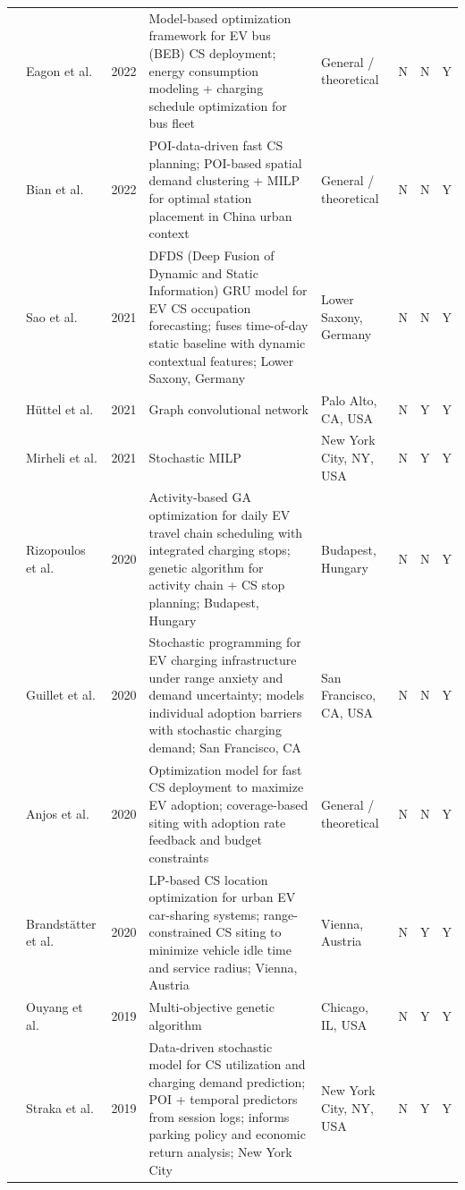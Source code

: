 \documentclass[letterpaper, 12pt, oneside, doublespacing]{Thesis}
\begin{document}
\begin{longtable}{L{0.9cm} L{1.8cm} L{0.7cm} L{2.5cm} L{2.1cm} L{0.7cm} L{0.7cm} L{0.7cm}}
\cite{model-based_framework_2022} & Eagon et al. & 2022 & Model-based optimization framework for EV bus (BEB) CS deployment; energy consumption modeling + charging schedule optimization for bus fleet & General {\slash} theoretical & N & N & Y \\
\cite{planning_of_2022} & Bian et al. & 2022 & POI-data-driven fast CS planning; POI-based spatial demand clustering + MILP for optimal station placement in China urban context & General {\slash} theoretical & N & N & Y \\
\cite{deep_information_2021} & Sao et al. & 2021 & DFDS (Deep Fusion of Dynamic and Static Information) GRU model for EV CS occupation forecasting; fuses time-of-day static baseline with dynamic contextual features; Lower Saxony, Germany & Lower Saxony, Germany & N & N & Y \\
\cite{deep_spatio-temporal_2021} & H\"uttel et al. & 2021 & Graph convolutional network & Palo Alto, CA, USA & N & Y & Y \\
\cite{hierarchical_optimization_2021} & Mirheli et al. & 2021 & Stochastic MILP & New York City, NY, USA & N & Y & Y \\
\cite{a_method_2020} & Rizopoulos et al. & 2020 & Activity-based GA optimization for daily EV travel chain scheduling with integrated charging stops; genetic algorithm for activity chain + CS stop planning; Budapest, Hungary & Budapest, Hungary & N & N & Y \\
\cite{electric_vehicle_2020} & Guillet et al. & 2020 & Stochastic programming for EV charging infrastructure under range anxiety and demand uncertainty; models individual adoption barriers with stochastic charging demand; San Francisco, CA & San Francisco, CA, USA & N & N & Y \\
\cite{increasing_electric_2020} & Anjos et al. & 2020 & Optimization model for fast CS deployment to maximize EV adoption; coverage-based siting with adoption rate feedback and budget constraints & General {\slash} theoretical & N & N & Y \\
\cite{location_of_2020} & Brandst\"atter et al. & 2020 & LP-based CS location optimization for urban EV car-sharing systems; range-constrained CS siting to minimize vehicle idle time and service radius; Vienna, Austria & Vienna, Austria & N & Y & Y \\
\cite{a_method_2019} & Ouyang et al. & 2019 & Multi-objective genetic algorithm & Chicago, IL, USA & N & Y & Y \\
\cite{predicting_popularity_2019} & Straka et al. & 2019 & Data-driven stochastic model for CS utilization and charging demand prediction; POI + temporal predictors from session logs; informs parking policy and economic return analysis; New York City & New York City, NY, USA & N & Y & Y \\

\end{longtable}
\end{document}
